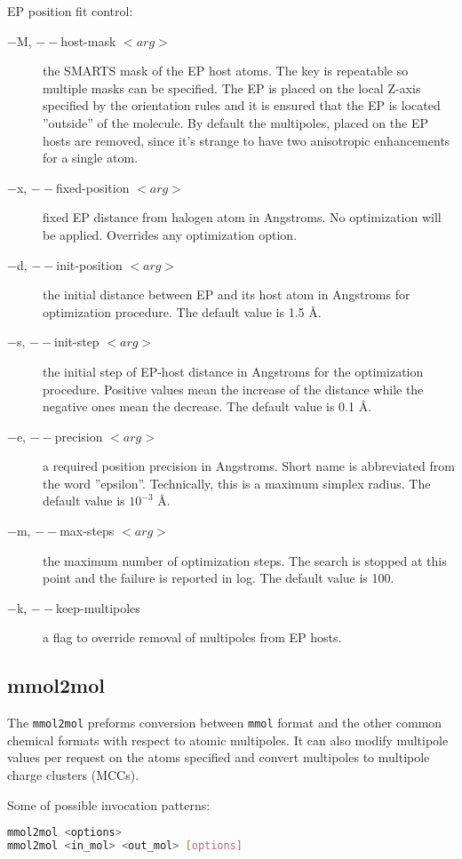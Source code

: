 \documentclass[10pt,a4paper]{article}
\begin{document}
EP position fit control:
\begin{description}
\item[$-$M, $--$host-mask $<arg>$] the SMARTS mask of the EP host atoms. The key is 
repeatable
so multiple masks can be specified. The EP is placed on the local Z-axis specified by the
orientation rules and it is ensured that the EP is located ''outside'' of the molecule.
 By default the multipoles, placed on the EP hosts are removed, since it's strange to have 
two anisotropic enhancements for a single atom.
\item[$-$x, $--$fixed-position $<arg>$] fixed EP distance from halogen atom in Angstroms. 
No optimization will be applied. Overrides any optimization option.
\item[$-$d, $--$init-position $<arg>$] the initial distance between EP and its host atom in
Angstroms for optimization procedure. The default value is 1.5 \AA.
\item[$-$s, $--$init-step $<arg>$] the initial step of EP-host distance in Angstroms for the
optimization procedure. Positive values mean the increase of the distance while the negative
ones mean the decrease. The default value is 0.1 \AA.
\item[$-$e, $--$precision $<arg>$] a required position precision in Angstroms. Short name
is abbreviated from the word ''epsilon''. Technically, this is a maximum simplex radius. The
default value is $10^{-3}$ \AA.
\item[$-$m, $--$max-steps $<arg>$] the maximum number of optimization steps. The search is
stopped at this point and the failure is reported in log. The default value is 100.
\item[$-$k, $--$keep-multipoles] a flag to override removal of multipoles from EP hosts.
\end{description}

\subsection{mmol2mol}
The \lstinline{mmol2mol} preforms conversion between \lstinline{mmol} format and the other 
common chemical formats with respect to atomic multipoles. It can also modify multipole 
values per request on the atoms specified and convert multipoles to multipole charge 
clusters (MCCs).

Some of possible invocation patterns:
\begin{lstlisting}[language=bash]
mmol2mol <options>
mmol2mol <in_mol> <out_mol> [options]
\end{lstlisting}
\end{document}

